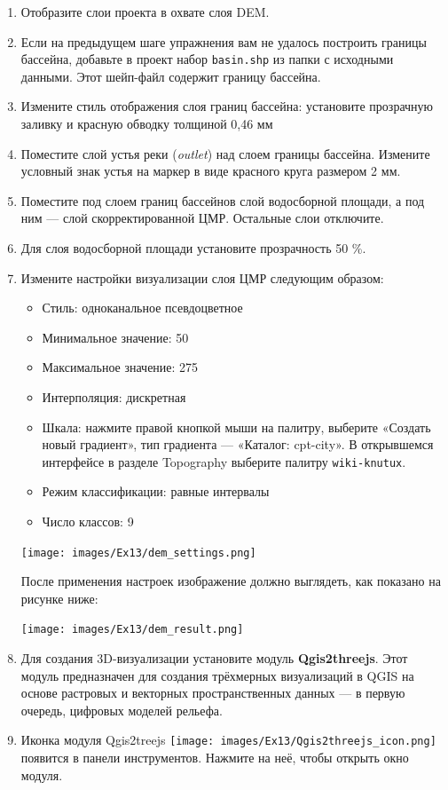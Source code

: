 \documentclass[
  12pt,
]{book}
\providecommand{\tightlist}{%
  \setlength{\itemsep}{0pt}\setlength{\parskip}{0pt}}
\begin{document}
\begin{enumerate}
\def\labelenumi{\arabic{enumi}.}
\item
  Отобразите слои проекта в охвате слоя DEM.
\item
  Если на предыдущем шаге упражнения вам не удалось построить границы бассейна, добавьте в проект набор \texttt{basin.shp} из папки с исходными данными. Этот шейп-файл содержит границу бассейна.
\item
  Измените стиль отображения слоя границ бассейна: установите прозрачную заливку и красную обводку толщиной 0,46 мм
\item
  Поместите слой устья реки (\emph{outlet}) над слоем границы бассейна. Измените условный знак устья на маркер в виде красного круга размером 2 мм.
\item
  Поместите под слоем границ бассейнов слой водосборной площади, а под ним --- слой скорректированной ЦМР. Остальные слои отключите.
\item
  Для слоя водосборной площади установите прозрачность 50 \%.
\item
  Измените настройки визуализации слоя ЦМР следующим образом:

  \begin{itemize}
  \tightlist
  \item
    Стиль: одноканальное псевдоцветное
  \item
    Минимальное значение: 50
  \item
    Максимальное значение: 275
  \item
    Интерполяция: дискретная
  \item
    Шкала: нажмите правой кнопкой мыши на палитру, выберите «Создать новый градиент», тип градиента --- «Каталог: cpt-city». В открывшемся интерфейсе в разделе Topography выберите палитру \texttt{wiki-knutux}.
  \item
    Режим классификации: равные интервалы
  \item
    Число классов: 9
  \end{itemize}

  \texttt{[image: images/Ex13/dem\_settings.png]}

  После применения настроек изображение должно выглядеть, как показано на рисунке ниже:

  \texttt{[image: images/Ex13/dem\_result.png]}
\item
  Для создания 3D-визуализации установите модуль \textbf{Qgis2threejs}. Этот модуль предназначен для создания трёхмерных визуализаций в QGIS на основе растровых и векторных пространственных данных --- в первую очередь, цифровых моделей рельефа.
\item
  Иконка модуля Qgis2treejs \texttt{[image: images/Ex13/Qgis2threejs\_icon.png]} появится в панели инструментов. Нажмите на неё, чтобы открыть окно модуля.


\end{enumerate}
\end{document}
